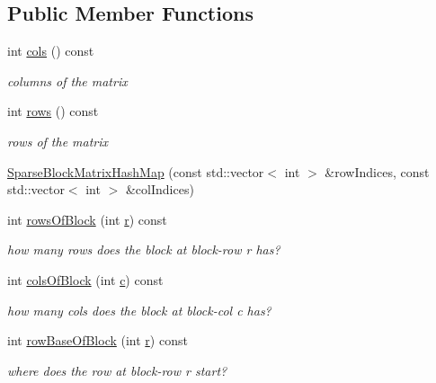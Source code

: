 \subsection*{Public Member Functions}
\begin{DoxyCompactItemize}
\item 
int \hyperlink{classg2o_1_1SparseBlockMatrixHashMap_acbf329a1870ef0991faea1a02afbe3a1}{cols} () const 
\begin{DoxyCompactList}\small\item\em columns of the matrix \end{DoxyCompactList}\item 
int \hyperlink{classg2o_1_1SparseBlockMatrixHashMap_a5f1fed0dc3e768a99aa6c92fc0f77fa2}{rows} () const 
\begin{DoxyCompactList}\small\item\em rows of the matrix \end{DoxyCompactList}\item 
\hyperlink{classg2o_1_1SparseBlockMatrixHashMap_abe4b64edb59d95b632d7f655445157df}{Sparse\+Block\+Matrix\+Hash\+Map} (const std\+::vector$<$ int $>$ \&row\+Indices, const std\+::vector$<$ int $>$ \&col\+Indices)
\item 
int \hyperlink{classg2o_1_1SparseBlockMatrixHashMap_a2bb620db9811ddac6a3a701b16f678ea}{rows\+Of\+Block} (int \hyperlink{sparse__helper_8cpp_acab531abaa74a7e664e3986f2522b33a}{r}) const 
\begin{DoxyCompactList}\small\item\em how many rows does the block at block-\/row r has? \end{DoxyCompactList}\item 
int \hyperlink{classg2o_1_1SparseBlockMatrixHashMap_a8c03c74d5c78e30d366cd663270d923c}{cols\+Of\+Block} (int \hyperlink{sparse__helper_8cpp_a4e1e0e72dd773439e333c84dd762a9c3}{c}) const 
\begin{DoxyCompactList}\small\item\em how many cols does the block at block-\/col c has? \end{DoxyCompactList}\item 
int \hyperlink{classg2o_1_1SparseBlockMatrixHashMap_afd1b66bfdc86abfee8178cf277fd5253}{row\+Base\+Of\+Block} (int \hyperlink{sparse__helper_8cpp_acab531abaa74a7e664e3986f2522b33a}{r}) const 
\begin{DoxyCompactList}\small\item\em where does the row at block-\/row r start? \end{DoxyCompactList}\item 

\end{DoxyCompactItemize}
